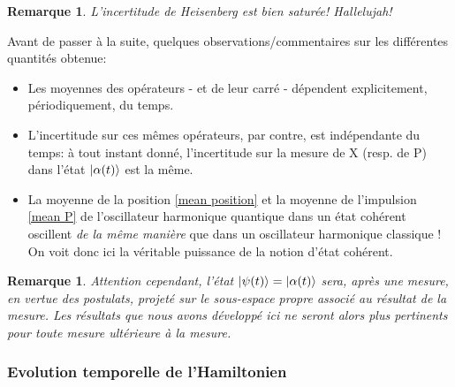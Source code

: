 \documentclass[11pt,oneside,a4paper]{article}
\newtheorem{remark}[theorem]{Remarque}
\begin{document}
\begin{remark}
  L'incertitude de Heisenberg est bien saturée! Hallelujah!
\end{remark}

Avant de passer à la suite, quelques observations/commentaires sur les différentes quantités obtenue:
\begin{itemize}
  \item Les moyennes des opérateurs - et de leur carré - dépendent explicitement, périodiquement, du temps.
  \item L'incertitude sur ces mêmes opérateurs, par contre, est indépendante du temps: à tout instant donné, l'incertitude sur la mesure de X (resp. de P) dans l'état $\ket{\alpha(t)}$ est la même.
  \item La moyenne de la position \eqref{mean position} et la moyenne de l'impulsion \eqref{mean P} de l'oscillateur harmonique quantique dans un état cohérent oscillent \emph{de la même manière} que dans un oscillateur harmonique classique ! On voit donc ici la véritable puissance de la notion d'état cohérent.
\end{itemize} 

\begin{remark}
  Attention cependant, l'état $\ket{\psi(t)} = \ket{\alpha(t)}$ sera, après une mesure, en vertue des postulats, projeté sur le sous-espace propre associé au résultat de la mesure. Les résultats que nous avons développé ici ne seront alors plus pertinents pour toute mesure ultérieure à la mesure.
\end{remark}

\subsubsection{Evolution temporelle de l'Hamiltonien}
\end{document}

